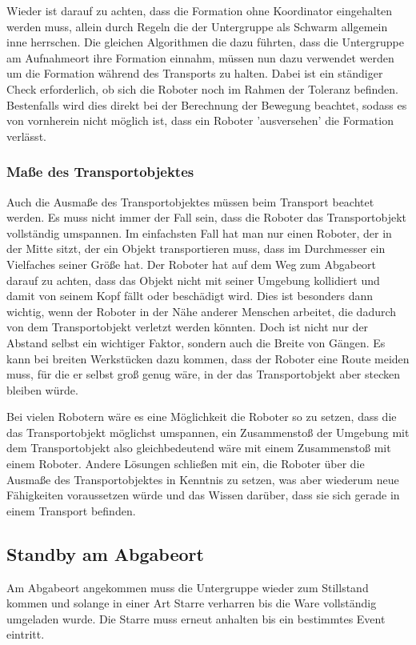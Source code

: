 Wieder ist darauf zu achten, dass die Formation ohne Koordinator eingehalten werden muss, allein durch Regeln die der Untergruppe als Schwarm allgemein inne herrschen.
Die gleichen Algorithmen die dazu führten, dass die Untergruppe am Aufnahmeort ihre Formation einnahm, müssen nun dazu verwendet werden um die Formation während des Transports zu halten. Dabei ist ein ständiger Check erforderlich, ob sich die Roboter noch im Rahmen der Toleranz befinden. Bestenfalls wird dies direkt bei der Berechnung der Bewegung beachtet, sodass es von vornherein nicht möglich ist, dass ein Roboter 'ausversehen' die Formation verlässt.

\subsubsection*{Maße des Transportobjektes}
Auch die Ausmaße des Transportobjektes müssen beim Transport beachtet werden. Es muss nicht immer der Fall sein, dass die Roboter das Transportobjekt vollständig umspannen. Im einfachsten Fall hat man nur einen Roboter, der in der Mitte sitzt, der ein Objekt transportieren muss, dass im Durchmesser ein Vielfaches seiner Größe hat. Der Roboter hat auf dem Weg zum Abgabeort darauf zu achten, dass das Objekt nicht mit seiner Umgebung kollidiert und damit von seinem Kopf fällt oder beschädigt wird. Dies ist besonders dann wichtig, wenn der Roboter in der Nähe anderer Menschen arbeitet, die dadurch von dem Transportobjekt verletzt werden könnten. Doch ist nicht nur der Abstand selbst ein wichtiger Faktor, sondern auch die Breite von Gängen. Es kann bei breiten Werkstücken dazu kommen, dass der Roboter eine Route meiden muss, für die er selbst groß genug wäre, in der das Transportobjekt aber stecken bleiben würde.

Bei vielen Robotern wäre es eine Möglichkeit die Roboter so zu setzen, dass die das Transportobjekt möglichst umspannen, ein Zusammenstoß der Umgebung mit dem Transportobjekt also gleichbedeutend wäre mit einem Zusammenstoß mit einem Roboter. Andere Lösungen schließen mit ein, die Roboter über die Ausmaße des Transportobjektes in Kenntnis zu setzen, was aber wiederum neue Fähigkeiten voraussetzen würde und das Wissen darüber, dass sie sich gerade in einem Transport befinden.

\subsection*{Standby am Abgabeort}
Am Abgabeort angekommen muss die Untergruppe wieder zum Stillstand kommen und solange in einer Art Starre verharren bis die Ware vollständig umgeladen wurde.
Die Starre muss erneut anhalten bis ein bestimmtes Event eintritt.


